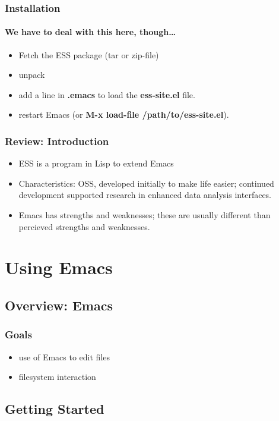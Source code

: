 \documentclass{beamer}
\begin{document}
\begin{frame}
  \frametitle{Installation}
  \framesubtitle{We have to deal with this here, though\ldots}
  \begin{itemize}
  \item Fetch the ESS package (tar or zip-file)
  \item unpack
  \item add a line in \textbf{.emacs} to load the \textbf{ess-site.el} file.
  \item restart Emacs (or \textbf{M-x load-file /path/to/ess-site.el}).
  \end{itemize}
\end{frame}

\begin{frame}
  \frametitle{Review: Introduction}
  \begin{itemize}
  \item ESS is a program in Lisp to extend Emacs
  \item Characteristics: OSS, developed initially to make life easier;
    continued development supported research in enhanced data analysis
    interfaces.
  \item Emacs has strengths and weaknesses; these are usually
    different than percieved strengths and weaknesses.
  \end{itemize}
\end{frame}

\section{Using Emacs}

\subsection{Overview: Emacs}

\begin{frame} \frametitle{Goals}
  \begin{itemize}
  \item use of Emacs to edit files
  \item filesystem interaction
  \end{itemize}
\end{frame}

\subsection{Getting Started}
\end{document}
